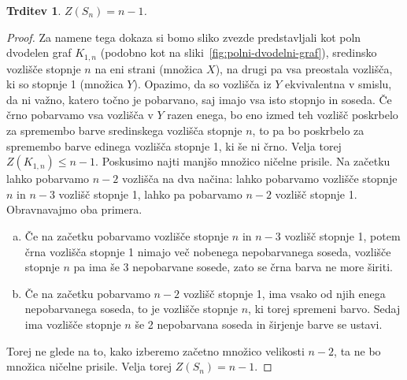 \documentclass[12pt,a4paper,twoside]{article}
\theoremstyle{definition} %
\theoremstyle{plain} %
\newtheorem{trditev}[definicija]{Trditev}
\numberwithin{equation}{section}  %
\begin{document}
\begin{trditev}
    $Z(S_n) = n - 1$.
\end{trditev}
\begin{proof}
    Za namene tega dokaza si bomo sliko zvezde predstavljali kot poln dvodelen graf $K_{1,n}$ (podobno kot na sliki~\ref{fig:polni-dvodelni-graf}), sredinsko vozlišče stopnje $n$ na eni strani (množica $X$), na drugi pa vsa preostala vozlišča, ki so stopnje 1 (množica $Y$).
    Opazimo, da so vozlišča iz $Y$ ekvivalentna v smislu, da ni važno, katero točno je pobarvano, saj imajo vsa isto stopnjo in soseda. Če črno pobarvamo vsa vozlišča v $Y$ razen enega, bo eno izmed teh vozlišč poskrbelo za spremembo barve sredinskega vozlišča stopnje $n$, to pa bo poskrbelo za spremembo barve edinega vozlišča stopnje 1, ki še ni črno. Velja torej $Z(K_{1,n}) \leq n-1$. Poskusimo najti manjšo množico ničelne prisile. Na začetku lahko pobarvamo $n-2$ vozlišča na dva načina: lahko pobarvamo vozlišče stopnje $n$ in $n-3$ vozlišč stopnje 1, lahko pa pobarvamo $n-2$ vozlišč stopnje 1. Obravnavajmo oba primera.
    \begin{enumerate}[a)]
        \item Če na začetku pobarvamo vozlišče stopnje $n$ in $n-3$ vozlišč stopnje 1, potem črna vozlišča stopnje 1 nimajo več nobenega nepobarvanega soseda, vozlišče stopnje $n$ pa ima še 3 nepobarvane sosede, zato se črna barva ne more širiti. 
        \item Če na začetku pobarvamo $n-2$ vozlišč stopnje 1, ima vsako od njih enega nepobarvanega soseda, to je vozlišče stopnje $n$, ki torej spremeni barvo. Sedaj ima vozlišče stopnje $n$ še 2 nepobarvana soseda in širjenje barve se ustavi.
    \end{enumerate}
    Torej ne glede na to, kako izberemo začetno množico velikosti $n-2$, ta ne bo množica ničelne prisile. Velja torej $Z(S_n) = n-1$.
\end{proof}
\end{document}
